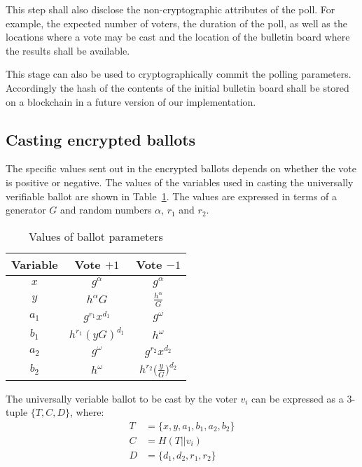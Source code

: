 This step shall also disclose the non-cryptographic
attributes of the poll. For example, the expected number of voters,
the duration of the poll, as well as the
locations where a vote may be cast and the location of the
bulletin board where the results shall be available.

This stage can also be used to cryptographically commit the
polling parameters.  Accordingly the hash of the contents of the
initial bulletin board shall be stored on a blockchain
in a future version of our implementation.


\subsection{Casting encrypted ballots}

The specific values sent out in the encrypted ballots depends on
whether the vote is positive or negative.  The values of the variables
used in casting the universally verifiable ballot are shown in
Table~\ref{table:ballotparams}.  The values are expressed in terms of
a generator $G$ and random numbers $\alpha$, $r_1$ and $r_2$.


\begin{table}[t]
\caption{Values of ballot parameters}
\begin{center}
  \begin{tabular}{c|c|c} 
    Variable & Vote $+1$ & Vote $-1$ \\\hline
    $x$   &  $g^\alpha$ &   $g^\alpha$ \\
    $y$   &  $h^\alpha G$ & $\frac{h^\alpha}{G}$  \\
    $a_1$ &  $g^{r_1}x^{d_1}$ & $g^\omega$  \\
    $b_1$ &  $h^{r_1}(yG)^{d_1}$ & $h^\omega$  \\
    $a_2$ &  $g^\omega$ &  $g^{r_2}x^{d_2}$ \\
    $b_2$ &  $h^\omega$ & $h^{r_2} \big( \frac{y}{G} \big)^{d_2}$ \\
\end{tabular}
\label{table:ballotparams}
\end{center}
\end{table}



The universally veriable ballot to be cast by the voter $v_i$
can be expressed as a 3-tuple $\{T,C,D\}$, where:
\begin{equation} \label{eq3}
\begin{split}
T & = \{ x, y, a_1, b_1, a_2, b_2 \} \\
C & = H( T || v_i ) \\    %
D & = \{d_1, d_2, r_1, r_2 \} 
\end{split}
\end{equation}

